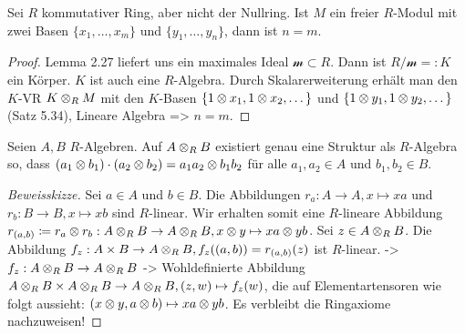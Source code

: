 \documentclass[../main.tex]{subfiles}
\begin{document}
\begin{corollary}
    Sei $R$ kommutativer Ring, aber nicht der Nullring. Ist $M$ ein freier $R$-Modul mit zwei Basen $\{x_1,\dots,x_m\}$ und $\{y_1,\dots,y_n\}$, dann ist $n=m$.
\end{corollary}
\begin{proof}
    Lemma 2.27 liefert uns ein maximales Ideal $\mathcal{m}\subset R$.
    Dann ist $R/\mathcal{m} =: K$ ein Körper. $K$ ist auch eine $R$-Algebra.
    Durch Skalarerweiterung erhält man den $K$-VR $K\otimes_R M$ mit den $K$-Basen $\{1\otimes x_1, 1\otimes x_2,\dots\}$ und $\{1\otimes y_1, 1\otimes y_2,\dots\}$ (Satz 5.34),
    Lineare Algebra => $n=m$.
\end{proof}

\begin{theorem}
    Seien $A,B$ $R$-Algebren.
    Auf $A\otimes_R B$ existiert genau eine Struktur als $R$-Algebra so, dass $(a_1\otimes b_1)\cdot (a_2 \otimes b_2) = a_1a_2 \otimes b_1b_2$ für alle $a_1,a_2\in A$ und $b_1,b_2\in B$.
\end{theorem}
\begin{proof}[Beweisskizze]
    Sei $a\in A$ und $b\in B$.
    Die Abbildungen $r_a:A\rightarrow A, x\mapsto xa$ und $r_b:B\rightarrow B, x\mapsto xb$ sind $R$-linear.
    Wir erhalten somit eine $R$-lineare Abbildung $r_{(a,b)} \coloneqq r_a\otimes r_b: A\otimes_R B \rightarrow A\otimes_R B, x\otimes y\mapsto xa\otimes yb$.
    Sei $z\in A\otimes_R B$. Die Abbildung $f_z: A\times B \rightarrow A\otimes_R B, f_z((a,b)) = r_{(a,b)}(z)$ ist $R$-linear.
    -> $f_z:A\otimes_R B\rightarrow A\otimes_R B$ 
    -> Wohldefinierte Abbildung $A\otimes_R B \times A\otimes_R B \rightarrow A\otimes_R B, (z,w) \mapsto f_z(w)$, die auf Elementartensoren wie folgt aussieht:
    $(x\otimes y, a\otimes b)\mapsto xa\otimes yb$.
    Es verbleibt die Ringaxiome nachzuweisen!
\end{proof}
\end{document}
